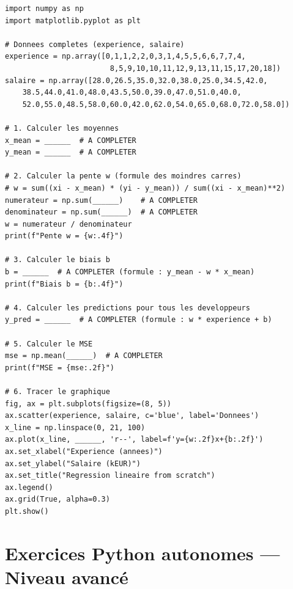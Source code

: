\begin{pythonbox}
\begin{lstlisting}
import numpy as np
import matplotlib.pyplot as plt

# Donnees completes (experience, salaire)
experience = np.array([0,1,1,2,2,0,3,1,4,5,5,6,6,7,7,4,
                        8,5,9,10,10,11,12,9,13,11,15,17,20,18])
salaire = np.array([28.0,26.5,35.0,32.0,38.0,25.0,34.5,42.0,
    38.5,44.0,41.0,48.0,43.5,50.0,39.0,47.0,51.0,40.0,
    52.0,55.0,48.5,58.0,60.0,42.0,62.0,54.0,65.0,68.0,72.0,58.0])

# 1. Calculer les moyennes
x_mean = ______  # A COMPLETER
y_mean = ______  # A COMPLETER

# 2. Calculer la pente w (formule des moindres carres)
# w = sum((xi - x_mean) * (yi - y_mean)) / sum((xi - x_mean)**2)
numerateur = np.sum(______)    # A COMPLETER
denominateur = np.sum(______)  # A COMPLETER
w = numerateur / denominateur
print(f"Pente w = {w:.4f}")

# 3. Calculer le biais b
b = ______  # A COMPLETER (formule : y_mean - w * x_mean)
print(f"Biais b = {b:.4f}")

# 4. Calculer les predictions pour tous les developpeurs
y_pred = ______  # A COMPLETER (formule : w * experience + b)

# 5. Calculer le MSE
mse = np.mean(______)  # A COMPLETER
print(f"MSE = {mse:.2f}")

# 6. Tracer le graphique
fig, ax = plt.subplots(figsize=(8, 5))
ax.scatter(experience, salaire, c='blue', label='Donnees')
x_line = np.linspace(0, 21, 100)
ax.plot(x_line, ______, 'r--', label=f'y={w:.2f}x+{b:.2f}')
ax.set_xlabel("Experience (annees)")
ax.set_ylabel("Salaire (kEUR)")
ax.set_title("Regression lineaire from scratch")
ax.legend()
ax.grid(True, alpha=0.3)
plt.show()
\end{lstlisting}
\end{pythonbox}

\section*{Exercices Python autonomes --- Niveau avanc\'{e}}


